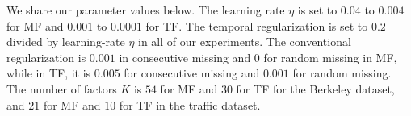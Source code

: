 %


We share our parameter values below.
The learning rate $\eta$ is set to $0.04$ to $0.004$ for MF and $0.001$ to $0.0001$ for TF.
The temporal regularization is set to $0.2$ divided by learning-rate $\eta$ in all of our experiments.
The conventional regularization is $0.001$ in consecutive missing and $0$ for random missing in MF, while in TF, it is $0.005$ for consecutive missing and $0.001$ for random missing.
The number of factors $K$ is $54$ for MF and $30$ for TF for the Berkeley dataset, and $21$ for MF and $10$ for TF in the traffic dataset. 


